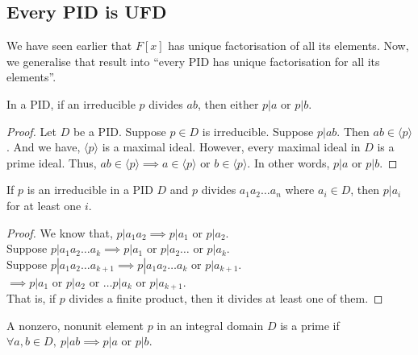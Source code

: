 \subsection{Every PID is UFD}
	We have seen earlier that $F[x]$ has unique factorisation of all its elements.
	Now, we generalise that result into ``every PID has unique factorisation for all its elements''.

\begin{lemma}
	In a PID, if an irreducible $p$ divides $ab$, then either $p|a$ or $p|b$.
\end{lemma}
\begin{proof}
	Let $D$ be a PID.
	Suppose $p \in D$ is irreducible.
	Suppose $p | ab$.
	Then $ab \in \langle p \rangle$.
	And we have, $\langle p \rangle$ is a maximal ideal.
	However, every maximal ideal in $D$ is a prime ideal.
	Thus, $ab \in \langle p \rangle \implies a \in \langle p \rangle \text{ or } b \in \langle p \rangle$.
	In other words, $p | a$ or $p | b$.
\end{proof}

\begin{corollary}
	If $p$ is an irreducible in a PID $D$ and $p$ divides $a_1a_2\dots a_n$ where $a_i \in D$, then $p|a_i$ for at least one $i$.
\end{corollary}
\begin{proof}
	We know that, $p | a_1a_2 \implies p | a_1 \text{ or } p | a_2$.\\
	Suppose $p | a_1a_2\dots a_k \implies p| a_1 \text{ or } p | a_2 \dots \text{ or } p | a_k$.\\
	Suppose $p | a_1a_2\dots a_{k+1} \implies p | a_1a_2\dots a_k \text{ or } p | a_{k+1}$.\\
	$\implies p|a_1 \text{ or } p|a_2 \text{ or } \dots p|a_k \text{ or } p | a_{k+1}$.\\
	That is, if $p$ divides a finite product, then it divides at least one of them.
\end{proof}

\begin{definition}
	A nonzero, nonunit element $p$ in an integral domain $D$ is a prime if $\forall a,b \in D,\ p|ab \implies p|a \text{ or } p|b$.
\end{definition}

